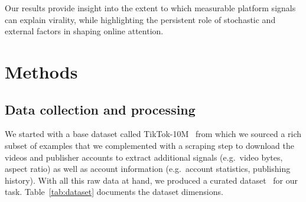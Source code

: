 \documentclass{article}
\begin{document}
Our results provide insight into the extent to which measurable platform signals can explain virality, while highlighting the persistent role of stochastic and external factors in shaping online attention.
\section{Methods}
\label{sec:methods}

\subsection{Data collection and processing}
\label{sec:data}

We started with a base dataset called TikTok-10M~\cite{tiktok10m} from which we sourced a rich subset of examples that we complemented with a scraping step to download the videos and publisher accounts to extract additional signals (e.g.\ video bytes, aspect ratio) as well as account information (e.g.\ account statistics, publishing history). With all this raw data at hand, we produced a curated dataset~\cite{viral_dataset} for our task. Table~\ref{tab:dataset} documents the dataset dimensions.
\end{document}
